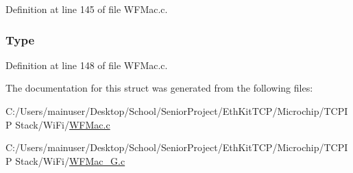 Definition at line 145 of file W\+F\+Mac.\+c.

\hypertarget{struct___e_n_c___p_r_e_a_m_b_l_e_ab2bf26921a49be66edb22ec5294bdfc9}{}
\subsubsection[{Type}]{ Type}\label{struct___e_n_c___p_r_e_a_m_b_l_e_ab2bf26921a49be66edb22ec5294bdfc9}


Definition at line 148 of file W\+F\+Mac.\+c.



The documentation for this struct was generated from the following files\+:\begin{DoxyCompactItemize}
\item 
C\+:/\+Users/mainuser/\+Desktop/\+School/\+Senior\+Project/\+Eth\+Kit\+T\+C\+P/\+Microchip/\+T\+C\+P\+I\+P Stack/\+Wi\+Fi/\hyperlink{_w_f_mac_8c}{W\+F\+Mac.\+c}\item 
C\+:/\+Users/mainuser/\+Desktop/\+School/\+Senior\+Project/\+Eth\+Kit\+T\+C\+P/\+Microchip/\+T\+C\+P\+I\+P Stack/\+Wi\+Fi/\hyperlink{_w_f_mac__24_g_8c}{W\+F\+Mac\+\_\+G.\+c}\end{DoxyCompactItemize}
